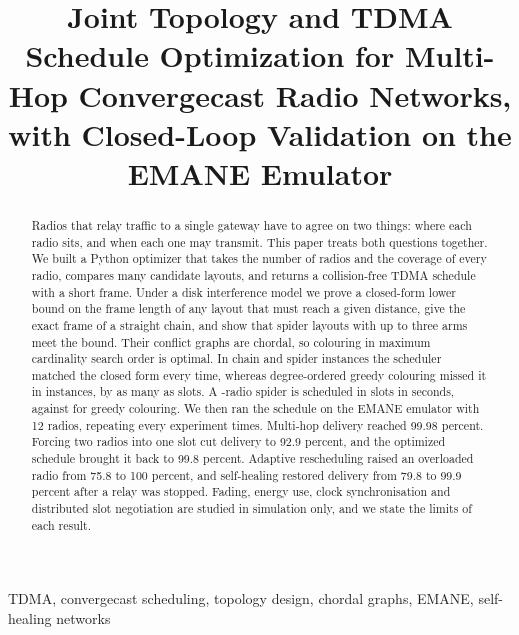\documentclass[conference]{IEEEtran}
\begin{document}
\title{Joint Topology and TDMA Schedule Optimization for Multi-Hop Convergecast Radio Networks, with Closed-Loop Validation on the EMANE Emulator}
\author{
}
\maketitle
\begin{abstract}
Radios that relay traffic to a single gateway have to agree on two things: where each radio sits, and when each one may transmit. This paper treats both questions together. We built a Python optimizer that takes the number of radios and the coverage of every radio, compares many candidate layouts, and returns a collision-free TDMA schedule with a short frame. Under a disk interference model we prove a closed-form lower bound on the frame length of any layout that must reach a given distance, give the exact frame of a straight chain, and show that spider layouts with up to three arms meet the bound. Their conflict graphs are chordal, so colouring in maximum cardinality search order is optimal. In \theoryCases{} chain and spider instances the scheduler matched the closed form every time, whereas degree-ordered greedy colouring missed it in \greedySub{} instances, by as many as \worstExcess{} slots. A \bigN-radio spider is scheduled in \bigF{} slots in \bigT{} seconds, against \bigG{} for greedy colouring. We then ran the schedule on the EMANE emulator with 12 radios, repeating every experiment \nRuns{} times. Multi-hop delivery reached 99.98 percent. Forcing two radios into one slot cut delivery to 92.9 percent, and the optimized schedule brought it back to 99.8 percent. Adaptive rescheduling raised an overloaded radio from 75.8 to 100 percent, and self-healing restored delivery from 79.8 to 99.9 percent after a relay was stopped. Fading, energy use, clock synchronisation and distributed slot negotiation are studied in simulation only, and we state the limits of each result.
\end{abstract}
\begin{IEEEkeywords}
TDMA, convergecast scheduling, topology design, chordal graphs, EMANE, self-healing networks
\end{IEEEkeywords}
\end{document}
